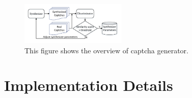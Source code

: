 \begin{figure}
  \centering
  \includegraphics[width=0.45\textwidth]{fig/generator/generator.pdf}
  \caption{This figure shows the overview of captcha generator.}
  \label{fig: generator}
\end{figure}

\section{Implementation Details}
%

